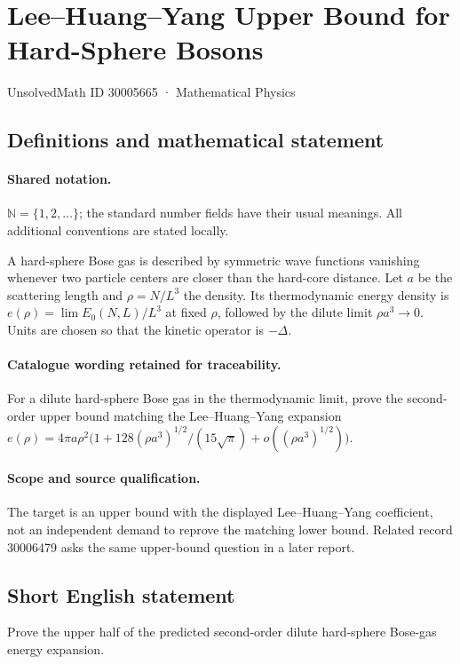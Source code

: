 \documentclass[11pt]{article}
\begin{document}
\setcounter{section}{30005664}
\section{Lee–Huang–Yang Upper Bound for Hard-Sphere Bosons}\label{30005665}
{\small UnsolvedMath ID 30005665 · Mathematical Physics}
\subsection{Definitions and mathematical statement}

\paragraph{Shared notation.}$\mathbb N=\{1,2,\ldots\}$; the standard number fields have their usual meanings. All additional conventions are stated locally.


A hard-sphere Bose gas is described by symmetric wave functions vanishing whenever two particle centers are closer than the hard-core distance. Let $a$ be the scattering length and $\rho=N/L^3$ the density. Its thermodynamic energy density is $e(\rho)=\lim E_0(N,L)/L^3$ at fixed $\rho$, followed by the dilute limit $\rho a^3\to0$. Units are chosen so that the kinetic operator is $-\Delta$.

\paragraph{Catalogue wording retained for traceability.}
For a dilute hard-sphere Bose gas in the thermodynamic limit, prove the second-order upper bound matching the Lee–Huang–Yang expansion $e(\rho)=4\pi a\rho^2\bigl(1+128(\rho a^3)^{1/2}/(15\sqrt\pi)+o((\rho a^3)^{1/2})\bigr)$.

\paragraph{Scope and source qualification.}The target is an upper bound with the displayed Lee--Huang--Yang coefficient, not an independent demand to reprove the matching lower bound. Related record 30006479 asks the same upper-bound question in a later report.
\subsection{Short English statement}
Prove the upper half of the predicted second-order dilute hard-sphere Bose-gas energy expansion.
\end{document}
